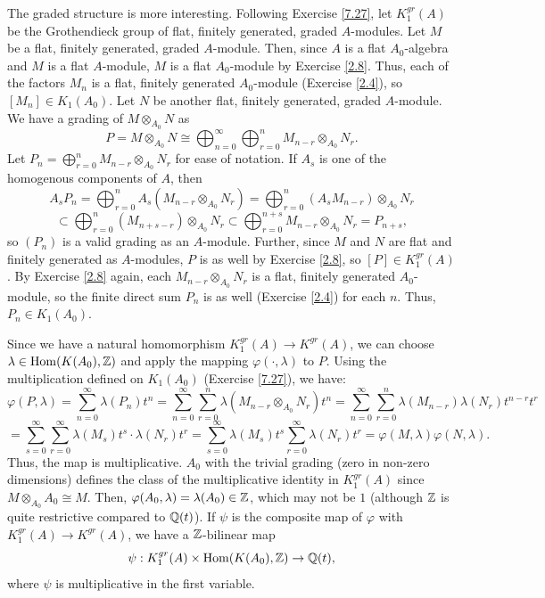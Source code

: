 The graded structure is more interesting. Following Exercise \ref{7.27}, let $K_1^{gr}(A)$ be the Grothendieck group of flat, finitely generated, graded 
$A$-modules. Let $M$ be a flat, finitely generated, graded $A$-module. Then, since $A$ is a flat $A_0$-algebra and $M$ is a flat $A$-module, $M$ is a flat
$A_0$-module by Exercise \ref{2.8}. Thus, each of the factors $M_n$ is a flat, finitely generated $A_0$-module (Exercise \ref{2.4}), so $[M_n] \in K_1(A_0)$. 
Let $N$ be another flat, finitely generated, graded $A$-module. We have a grading of $M \otimes_{A_0} N$ as
$$P = M \otimes_{A_0} N \cong \bigoplus_{n=0}^{\infty} \bigoplus_{r=0}^n M_{n-r} \otimes_{A_0} N_r.$$
Let $P_n = \bigoplus_{r=0}^n M_{n-r} \otimes_{A_0} N_r$ for ease of notation. If $A_s$ is one of the homogenous components of $A$, then
$$A_s P_n = \bigoplus_{r=0}^n A_s(M_{n-r} \otimes_{A_0} N_r) = \bigoplus_{r=0}^n (A_s M_{n-r}) \otimes_{A_0} N_r$$
$$\subset \bigoplus_{r=0}^n (M_{n + s - r}) \otimes_{A_0} N_r \subset \bigoplus_{r=0}^{n+s} M_{n - r} \otimes_{A_0} N_r = P_{n+s},$$
so $(P_n)$ is a valid grading as an $A$-module. Further, since $M$ and $N$ are flat and finitely generated as $A$-modules, $P$ is as well by Exercise \ref{2.8},
so $[P] \in K_1^{gr}(A)$. By Exercise \ref{2.8} again, each $M_{n-r} \otimes_{A_0} N_r$ is a flat, finitely generated $A_0$-module, so the finite direct sum
$P_n$ is as well (Exercise \ref{2.4}) for each $n$. Thus, $P_n \in K_1(A_0)$. 

Since we have a natural homomorphism $K_1^{gr}(A) \to K^{gr}(A)$, we can choose $\lambda \in \operatorname{Hom}(K(A_0), \mathbb{Z})$ and apply the mapping $\varphi(\cdot,\lambda)$ to $P$. 
Using the multiplication defined on $K_1(A_0)$ (Exercise \ref{7.27}), we have:
$$\varphi(P,\lambda) = \sum_{n=0}^{\infty}\lambda(P_n)t^n = \sum_{n=0}^{\infty}\sum_{r=0}^n \lambda(M_{n-r} \otimes_{A_0} N_r)t^n
= \sum_{n=0}^{\infty}\sum_{r=0}^n \lambda(M_{n-r})\lambda(N_r)t^{n-r} t^r$$
$$= \sum_{s=0}^{\infty}\sum_{r=0}^{\infty} \lambda(M_s)t^s \cdot \lambda(N_r)t^r = \sum_{s=0}^{\infty}\lambda(M_s)t^s\sum_{r=0}^{\infty}\lambda(N_r)t^r
= \varphi(M,\lambda)\varphi(N,\lambda).$$
Thus, the map is multiplicative. $A_0$ with the trivial grading (zero in non-zero dimensions) defines the class of the multiplicative identity in $K_1^{gr}(A)$
since $M \otimes_{A_0} A_0 \cong M$. Then, $\varphi(A_0,\lambda) = \lambda(A_0) \in \mathbb{Z}$, which may not be $1$ (although $\mathbb{Z}$ is quite restrictive compared to $\mathbb{Q}(t)$).
If $\psi$ is the composite map of $\varphi$ with $K_1^{gr}(A) \to K^{gr}(A)$, we have a $\mathbb{Z}$-bilinear map
$$\psi : K_1^{gr}(A) \times \operatorname{Hom}(K(A_0), \mathbb{Z}) \to \mathbb{Q}(t),$$
where $\psi$ is multiplicative in the first variable.

